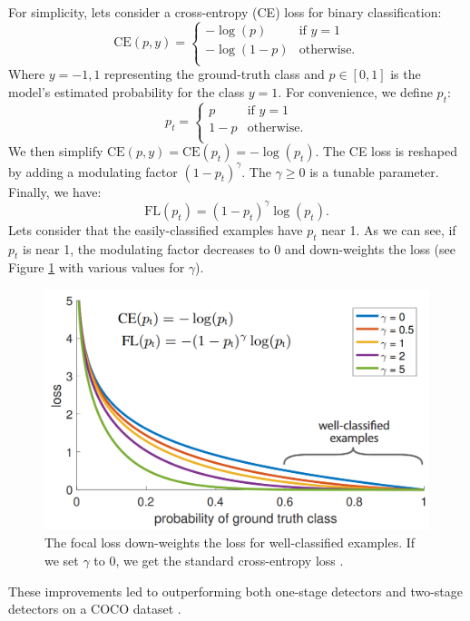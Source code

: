 For simplicity, lets consider a cross-entropy (CE) loss for binary classification:
\[ 
\text{CE}(p, y) = \left\{
\begin{array}{ll}
    -\log(p)   & \text{if } y = 1 \\
    -\log(1-p) & \text{otherwise.} \\
\end{array} 
\right. 
\]
Where $y = {-1, 1}$ representing the ground-truth class and $p \in [0, 1]$ is the model's estimated probability for the class $y = 1$. For convenience, we define $p_t$:
\[ 
p_t = \left\{
\begin{array}{ll}
    p   & \text{if } y = 1 \\
    1-p & \text{otherwise.} \\
\end{array} 
\right. 
\]
We then simplify $\text{CE}(p,y) = \text{CE}(p_t) = -\log(p_t)$. The CE loss is reshaped by adding a modulating factor $(1 - p_t)^\gamma$. The $\gamma \geq 0$ is a tunable parameter. Finally, we have:
$$
    \text{FL}(p_t) = (1-p_t)^\gamma \log(p_t).
$$
Lets consider that the easily-classified examples have $p_t$ near 1. As we can see, if $p_t$ is near 1, the modulating factor decreases to 0 and down-weights the loss (see Figure \ref{fig:focalloss} with various values for $\gamma$).

\begin{figure}[h]
    \centering
    \includegraphics[width=0.7\linewidth]{Sources/Figures/focalloss.png}
    \caption{The focal loss down-weights the loss for well-classified examples. If we set $\gamma$ to 0, we get the standard cross-entropy loss \cite{retinanet}.}
    \label{fig:focalloss}
\end{figure}

These improvements led to outperforming both one-stage detectors and two-stage detectors on a COCO dataset \cite{coco}.



